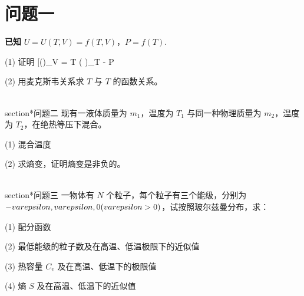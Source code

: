 \section{问题一}
\textbf{已知} $U = U(T, V) = f(T, V)$，$P = f(T)$.

(1) 证明
[\left(\right)_V = T \left(  \right)_T - P\]

(2) 用麦克斯韦关系求 $T$ 与 $T$ 的函数关系。

\\section*{问题二}
现有一液体质量为 $m_1$，温度为 $T_1$ 与同一种物理质量为 $m_2$，温度为 $T_2$，在绝热等压下混合。

(1) 混合温度

(2) 求熵变，证明熵变是非负的。

\\section*{问题三}
一物体有 $N$ 个粒子，每个粒子有三个能级，分别为 $-\\varepsilon, \\varepsilon, 0 (\\varepsilon > 0)$，试按照玻尔兹曼分布，求：

(1) 配分函数

(2) 最低能级的粒子数及在高温、低温极限下的近似值

(3) 热容量 $C_v$ 及在高温、低温下的极限值

(4) 熵 $S$ 及在高温、低温下的近似值